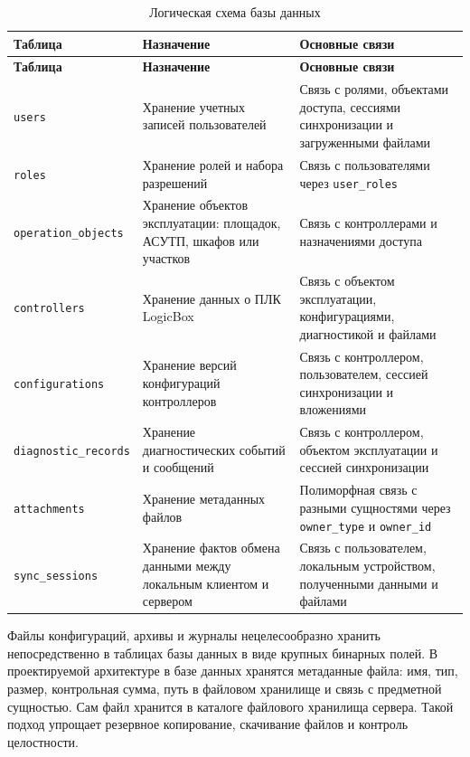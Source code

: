 \small
\begin{longtable}{|p{}|p{}|p{}|}
    \caption{Логическая схема базы данных} \label{tab:logical_schema} \\
    \hline
    \textbf{Таблица} & \textbf{Назначение} & \textbf{Основные связи} \\ \hline
    \endfirsthead

    \tabcont{\ref{tab:logical_schema}}
    \textbf{Таблица} & \textbf{Назначение} & \textbf{Основные связи} \\ \hline
    \endhead

    \hline
    \endfoot

    \hline
    \endlastfoot

    \texttt{users} & Хранение учетных записей пользователей & Связь с ролями, объектами доступа, сессиями синхронизации и загруженными файлами \\ \hline
    \texttt{roles} & Хранение ролей и набора разрешений & Связь с пользователями через \texttt{user\_roles} \\ \hline
    \texttt{operation\_objects} & Хранение объектов эксплуатации: площадок, АСУТП, шкафов или участков & Связь с контроллерами и назначениями доступа \\ \hline
    \texttt{controllers} & Хранение данных о ПЛК LogicBox & Связь с объектом эксплуатации, конфигурациями, диагностикой и файлами \\ \hline
    \texttt{configurations} & Хранение версий конфигураций контроллеров & Связь с контроллером, пользователем, сессией синхронизации и вложениями \\ \hline
    \texttt{diagnostic\_records} & Хранение диагностических событий и сообщений & Связь с контроллером, объектом эксплуатации и сессией синхронизации \\ \hline
    \texttt{attachments} & Хранение метаданных файлов & Полиморфная связь с разными сущностями через \texttt{owner\_type} и \texttt{owner\_id} \\ \hline
    \texttt{sync\_sessions} & Хранение фактов обмена данными между локальным клиентом и сервером & Связь с пользователем, локальным устройством, полученными данными и файлами \\ \hline
\end{longtable}
\normalsize

Файлы конфигураций, архивы и журналы нецелесообразно хранить непосредственно в
таблицах базы данных в виде крупных бинарных полей. В проектируемой архитектуре
в базе данных хранятся метаданные файла: имя, тип, размер, контрольная сумма,
путь в файловом хранилище и связь с предметной сущностью. Сам файл хранится в
каталоге файлового хранилища сервера. Такой подход упрощает резервное
копирование, скачивание файлов и контроль целостности.

